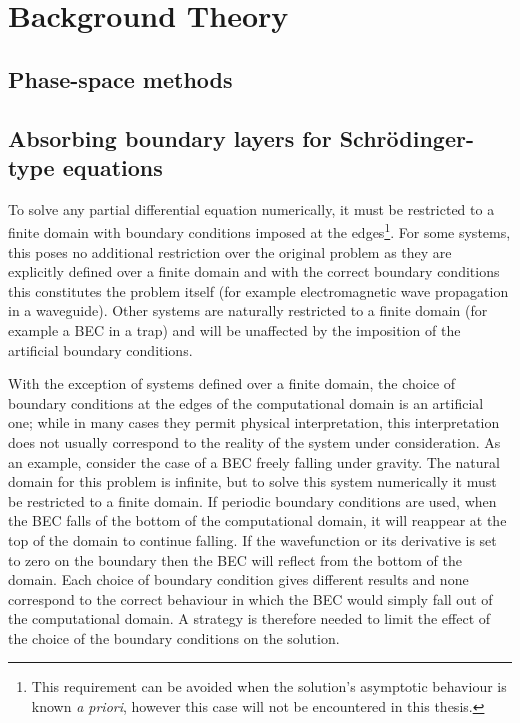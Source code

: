 \chapter{Background Theory}
\label{BackgroundTheory}
\graphicspath{{Figures/BackgroundTheory/}{Figures/Common/}}

\section{Phase-space methods}
\label{BackgroundTheory:PhaseSpaceMethods}

\section{Absorbing boundary layers for Schrödinger-type equations}
\label{BackgroundTheory:AbsorbingBoundaryLayers}


To solve any partial differential equation numerically, it must be restricted to a finite domain with boundary conditions imposed at the edges\footnote{This requirement can be avoided when the solution's asymptotic behaviour is known \emph{a priori}, however this case will not be encountered in this thesis.}. For some systems, this poses no additional restriction over the original problem as they are explicitly defined over a finite domain and with the correct boundary conditions this constitutes the problem itself (for example electromagnetic wave propagation in a waveguide). Other systems are naturally restricted to a finite domain (for example a BEC in a trap) and will be unaffected by the imposition of the artificial boundary conditions. 

With the exception of systems defined over a finite domain, the choice of boundary conditions at the edges of the computational domain is an artificial one; while in many cases they permit physical interpretation, this interpretation does not usually correspond to the reality of the system under consideration. As an example, consider the case of a BEC freely falling under gravity. The natural domain for this problem is infinite, but to solve this system numerically it must be restricted to a finite domain. If periodic boundary conditions are used, when the BEC falls of the bottom of the computational domain, it will reappear at the top of the domain to continue falling. If the wavefunction or its derivative is set to zero on the boundary then the BEC will reflect from the bottom of the domain. Each choice of boundary condition gives different results and none correspond to the correct behaviour in which the BEC would simply fall out of the computational domain. A strategy is therefore needed to limit the effect of the choice of the boundary conditions on the solution.

